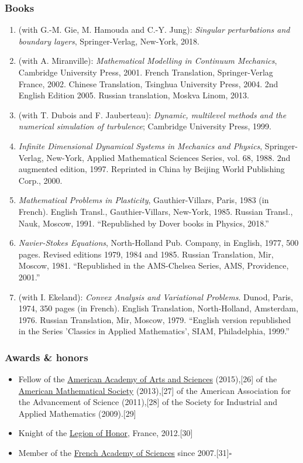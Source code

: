 \documentclass{article}
\begin{document}
\subsubsection{Books}
\begin{enumerate}
	\item (with G.-M. Gie, M. Hamouda and C.-Y. Jung): \textit{Singular perturbations and boundary layers}, Springer-Verlag, New-York, 2018.
	\item (with A. Miranville): \textit{Mathematical Modelling in Continuum Mechanics}, Cambridge University Press, 2001. French Translation, Springer-Verlag France, 2002. Chinese Translation, Tsinghua University Press, 2004. 2nd English Edition 2005. Russian translation, Moskva Linom, 2013.
	\item (with T. Dubois and F. Jauberteau): \textit{Dynamic, multilevel methods and the numerical simulation of turbulence}; Cambridge University Press, 1999.
	\item \textit{Infinite Dimensional Dynamical Systems in Mechanics and Physics}, Springer-Verlag, New-York, Applied Mathematical Sciences Series, vol. 68, 1988. 2nd augmented edition, 1997. Reprinted in China by Beijing World Publishing Corp., 2000.
	\item \textit{Mathematical Problems in Plasticity}, Gauthier-Villars, Paris, 1983 (in French). English Transl., Gauthier-Villars, New-York, 1985. Russian Transl., Nauk, Moscow, 1991. ``Republished by Dover books in Physics, 2018.''
	\item \textit{Navier-Stokes Equations}, North-Holland Pub. Company, in English, 1977, 500 pages. Revised editions 1979, 1984 and 1985. Russian Translation, Mir, Moscow, 1981. ``Republished in the AMS-Chelsea Series, AMS, Providence, 2001.''
	\item (with I. Ekeland): \textit{Convex Analysis and Variational Problems}. Dunod, Paris, 1974, 350 pages (in French). English Translation, North-Holland, Amsterdam, 1976. Russian Translation, Mir, Moscow, 1979. ``English version republished in the Series 'Classics in Applied Mathematics', SIAM, Philadelphia, 1999.''
\end{enumerate}

\subsubsection{Awards \& honors}
\begin{itemize}
	\item Fellow of the \href{https://en.wikipedia.org/wiki/American_Academy_of_Arts_and_Sciences}{American Academy of Arts and Sciences} (2015),[26] of the \href{https://en.wikipedia.org/wiki/American_Mathematical_Society}{American Mathematical Society} (2013),[27] of the American Association for the Advancement of Science (2011),[28] of the Society for Industrial and Applied Mathematics (2009).[29]
	\item Knight of the \href{https://en.wikipedia.org/wiki/Legion_of_Honour}{Legion of Honor}, France, 2012.[30]
	\item Member of the \href{https://en.wikipedia.org/wiki/French_Academy_of_Sciences}{French Academy of Sciences} since 2007.[31]\hfill$\square$
\end{itemize}
\end{document}
